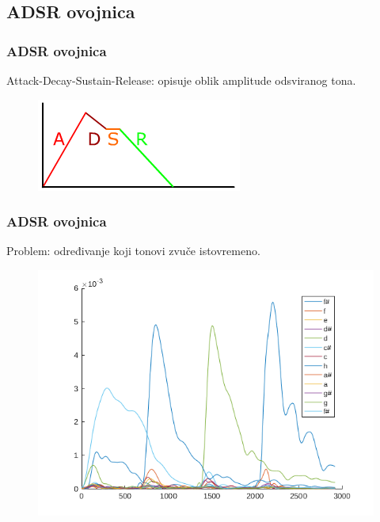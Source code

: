 \documentclass[11pt]{beamer}
\begin{document}
  \subsection{ADSR ovojnica}
  \begin{frame}
    \frametitle{ADSR ovojnica}
    Attack-Decay-Sustain-Release: opisuje oblik amplitude odsviranog tona.\\
    \vspace{10pt}
    \begin{figure}
      \centering
      \includegraphics[height=0.4\textheight]{Adsr3.png}
    \end{figure}
  \end{frame}
  
  \begin{frame}
    \frametitle{ADSR ovojnica}
    Problem: određivanje koji tonovi zvuče istovremeno.
    \begin{figure}
      \centering
      \includegraphics[height=0.8\textheight]{adsr_anomalija.png}
    \end{figure}
  \end{frame}
  
\end{document}
